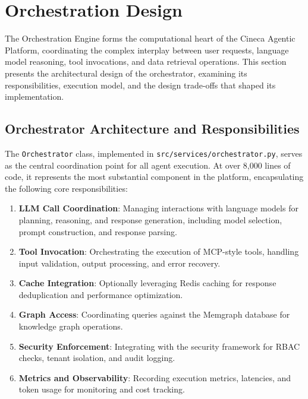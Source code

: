 
\section{Orchestration Design}
\label{sec:orchestration-design}

The Orchestration Engine forms the computational heart of the Cineca Agentic Platform, coordinating the complex interplay between user requests, language model reasoning, tool invocations, and data retrieval operations. This section presents the architectural design of the orchestrator, examining its responsibilities, execution model, and the design trade-offs that shaped its implementation.

\subsection{Orchestrator Architecture and Responsibilities}

The \texttt{Orchestrator} class, implemented in \texttt{src/services/orchestrator.py}, serves as the central coordination point for all agent execution. At over 8,000 lines of code, it represents the most substantial component in the platform, encapsulating the following core responsibilities:

\begin{enumerate}
    \item \textbf{LLM Call Coordination}: Managing interactions with language models for planning, reasoning, and response generation, including model selection, prompt construction, and response parsing.
    
    \item \textbf{Tool Invocation}: Orchestrating the execution of MCP-style tools, handling input validation, output processing, and error recovery.
    
    \item \textbf{Cache Integration}: Optionally leveraging Redis caching for response deduplication and performance optimization.
    
    \item \textbf{Graph Access}: Coordinating queries against the Memgraph database for knowledge graph operations.
    
    \item \textbf{Security Enforcement}: Integrating with the security framework for RBAC checks, tenant isolation, and audit logging.
    
    \item \textbf{Metrics and Observability}: Recording execution metrics, latencies, and token usage for monitoring and cost tracking.
\end{enumerate}

